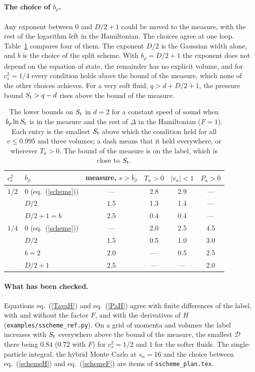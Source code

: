 \documentclass[11pt,aps,preprint,nofootinbib,superscriptaddress,tightenlines]{revtex4-2}
\def\Eq#1{eq.~(\ref{#1})}
\def\Tab#1{Table~\ref{#1}}
\let\oldparagraph\paragraph
\renewcommand{\paragraph}{\par\bigskip\oldparagraph}
\begin{document}
\paragraph{The choice of $b_\rho$.}  Any exponent between $0$ and $D/2+1$ could be moved to the measure, with the rest of the logarithm left in the
Hamiltonian.  The choices agree at one loop.  \Tab{tab:bounds} compares four of them.  The exponent $D/2$ is the Gaussian width alone, and $b$ is the
choice of the split scheme.  With $b_\rho=D/2+1$ the exponent does not depend on the equation of state, the remainder has no explicit volume, and
for $c_s^2=1/4$ every condition holds above the bound of the measure, which none of the other choices achieves.  For a very soft fluid, $q>d+D/2+1$,
the pressure bound $S_{\rm t}>q-d$ rises above the bound of the measure.

\begin{table}[h]
\caption{The lower bounds on $S_{\rm t}$ in $d=2$ for a constant speed of sound when $b_\rho\ln S_{\rm t}$ is in the measure and the rest of $\Delta$ in
the Hamiltonian ($F=1$).  Each entry is the smallest $S_{\rm t}$ above which the condition held for all $v\le0.995$ and three volumes; a dash means that
it held everywhere, or wherever $T_a>0$.  The bound of the measure is on the label, which is close to $S_{\rm t}$.}
\label{tab:bounds}
\begin{center}
\begin{tabular}{llcccc}
\toprule
$c_s^2$ & $b_\rho$ & measure, $s>b_\rho$ & $T_a>0$ & $|v_a|<1$ & $P_a>0$ \\
\midrule
$1/2$ & $0$ (\Eq{scheme}) & --- & 2.8 & 2.9 & --- \\
      & $D/2$ & 1.5 & 1.3 & 1.4 & --- \\
      & $D/2+1=b$ & 2.5 & 0.4 & 0.4 & --- \\
\midrule
$1/4$ & $0$ (\Eq{scheme}) & --- & 2.0 & 2.5 & 4.5 \\
      & $D/2$ & 1.5 & 0.5 & 1.0 & 3.0 \\
      & $b=2$ & 2.0 & --- & 0.5 & 2.5 \\
      & $D/2+1$ & 2.5 & --- & --- & 2.0 \\
\bottomrule
\end{tabular}
\end{center}
\end{table}

\paragraph{What has been checked.}  Equations \Eq{TavaH} and \Eq{PaH} agree with finite differences of the label, with and without the factor $F$,
and with the derivatives of $H$ (\nolinkurl{examples/sscheme_ref.py}).  On a grid of momenta and volumes the label increases with $S_{\rm t}$
everywhere above the bound of the measure, the smallest $\mathcal D$ there being $0.84$ ($0.72$ with $F$) for $c_s^2=1/2$ and $1$ for the softer
fluids.  The single-particle integral, the hybrid Monte Carlo at $s_a=16$ and the choice between \Eq{schemeH} and \Eq{schemeF} are items of
\nolinkurl{sscheme_plan.tex}.
\end{document}
